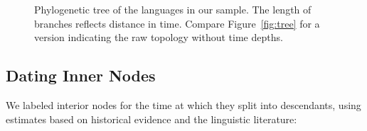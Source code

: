 \documentclass[11pt,a4paper]{article}
\begin{document}
\begin{figure}
    \centering
	\caption{Phylogenetic tree of the languages in our sample. The length of branches reflects distance in time. Compare Figure~\ref{fig:tree} for a version indicating the raw topology without time depths.}
    \label{fig:tree-times}
\end{figure}




\subsection{Dating Inner Nodes}
We labeled interior nodes for the time at which they split into descendants, using estimates based on historical evidence and the linguistic literature:


\end{document}
